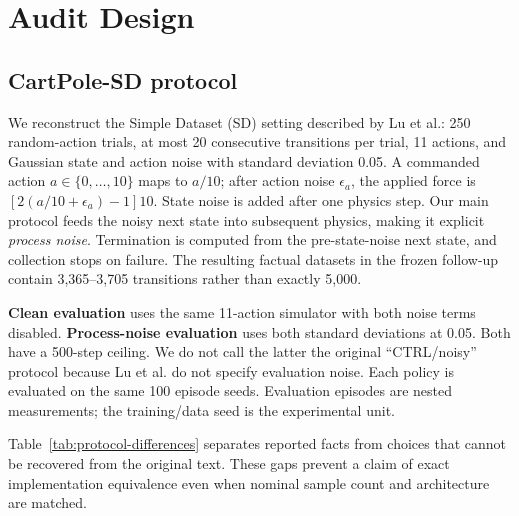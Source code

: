 \documentclass[runningheads]{llncs}
\begin{document}
\section{Audit Design}

\subsection{CartPole-SD protocol}

We reconstruct the Simple Dataset (SD) setting described by Lu et al.: 250
random-action trials, at most 20 consecutive transitions per trial, 11 actions,
and Gaussian state and action noise with standard deviation 0.05. A commanded
action $a\in\{0,\ldots,10\}$ maps to $a/10$; after action noise $\epsilon_a$,
the applied force is $[2(a/10+\epsilon_a)-1]10$. State noise is added after one
physics step. Our main protocol feeds the noisy next state into subsequent
physics, making it explicit \emph{process noise}. Termination is computed from
the pre-state-noise next state, and collection stops on failure. The resulting
factual datasets in the frozen follow-up contain 3,365--3,705 transitions rather
than exactly 5,000.

\textbf{Clean evaluation} uses the same 11-action simulator with both noise
terms disabled. \textbf{Process-noise evaluation} uses both standard deviations
at 0.05. Both have a 500-step ceiling. We do not call the latter the original
``CTRL/noisy'' protocol because Lu et al. do not specify evaluation noise. Each
policy is evaluated on the same 100 episode seeds. Evaluation episodes are
nested measurements; the training/data seed is the experimental unit.

Table~\ref{tab:protocol-differences} separates reported facts from choices that
cannot be recovered from the original text. These gaps prevent a claim of exact
implementation equivalence even when nominal sample count and architecture are
matched.
\end{document}
